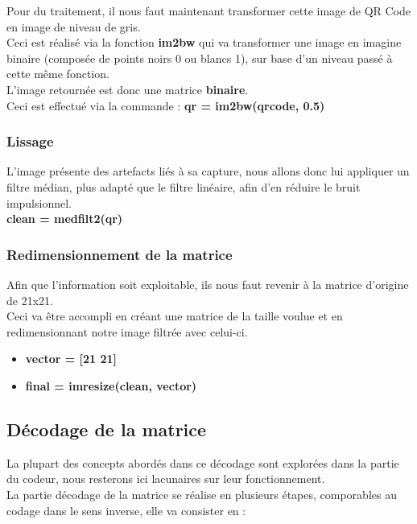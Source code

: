 \documentclass{report}
\begin{document}
				Pour du traitement, il nous faut maintenant transformer cette image de QR Code en image de niveau de gris.\\

				Ceci est réalisé via la fonction \textbf{im2bw} qui va transformer une image en imagine binaire (composée de points noirs 0 ou blancs 1), sur base d'un niveau passé à cette même fonction.\\
				L'image retournée est donc une matrice \textbf{binaire}.\\

				Ceci est effectué via la commande : \textbf{qr = im2bw(qrcode, 0.5)}

			\subsubsection{Lissage}

				L'image présente des artefacts liés à sa capture, nous allons donc lui appliquer un filtre médian, plus adapté que le filtre linéaire, afin d'en réduire le bruit impulsionnel.\\

				\textbf{clean = medfilt2(qr)}

			\subsubsection{Redimensionnement de la matrice}

				Afin que l'information soit exploitable, ils nous faut revenir à la matrice d'origine de 21x21.\\
				Ceci va être accompli en créant une matrice de la taille voulue et en redimensionnant notre image filtrée avec celui-ci.\\

				\begin{itemize}
					\item \textbf{vector = [21 21]}
					\item \textbf{final = imresize(clean, vector)}
				\end{itemize}


		\subsection{Décodage de la matrice}

                La plupart des concepts abordés dans ce décodage sont explorées dans la partie du codeur, nous resterons ici lacunaires sur leur fonctionnement.\\
		        La partie décodage de la matrice se réalise en plusieurs étapes, comporables au codage dans le sens inverse, elle va consister en : \\
\end{document}

